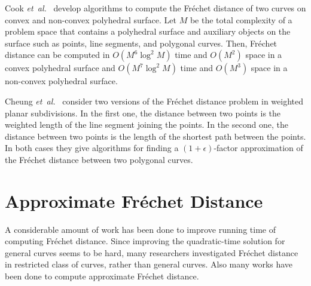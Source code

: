 \documentclass[12pt]{dalthesis}
\newcommand{\etal}{{\em et~al.\/}}
\newcommand{\Frechet}{Fr\'echet }
\begin{document}
Cook \etal~\cite{Cook2009} develop algorithms to compute the \Frechet distance of 
two curves  on convex and non-convex polyhedral surface.
Let $M$ be the total complexity of a problem space that contains
a polyhedral surface and auxiliary objects on the surface such as points,
line segments, and polygonal curves.
Then, \Frechet distance can be computed in $O(M^6 \log^2 M)$ time and $O(M^2)$ space in a convex polyhedral surface and 
$O(M^7 \log^2 M)$ time and $O(M^3)$ space in a non-convex polyhedral surface.

Cheung \etal~\cite{Cheung2009} consider two versions of 
the \Frechet distance problem in weighted planar subdivisions. In the first one, the distance between two points is the weighted length of the line segment joining the points. In the second one, the distance between two points is the length of the shortest path between the points. In both cases they give algorithms for finding a $(1+\epsilon)$-factor approximation of the \Frechet distance between two polygonal curves. 


\section{Approximate \Frechet Distance}
A considerable amount of work 
has been done to improve running time
of computing \Frechet distance. 
Since improving the quadratic-time solution for general curves seems
to be hard, many researchers investigated \Frechet distance in restricted class 
of curves, rather than general curves. 
Also many works have been done 
to compute approximate \Frechet distance. 
\end{document}
